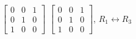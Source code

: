{$\begin{bmatrix}
		0 & 0 & 1 \\ 
		0 & 1 & 0 \\ 
		1 & 0 & 0
		\end{bmatrix}$ }
{$\begin{bmatrix}
		0 & 0 & 1 \\ 
		0 & 1 & 0 \\ 
		1 & 0 & 0
		\end{bmatrix}$, $R_1\leftrightarrow R_3$}